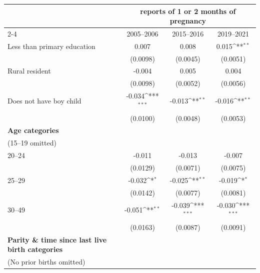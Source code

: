 {
\def\sym#1{\ifmmode^{#1}\else\(^{#1}\)\fi}
\begin{tabular}{l*{3}{c}}
\toprule
                    &\multicolumn{3}{c}{reports of 1 or 2 months of pregnancy}        \\\cmidrule(lr){2-4}
                    &\multicolumn{1}{c}{2005--2006}&\multicolumn{1}{c}{2015--2016}&\multicolumn{1}{c}{2019--2021}\\
\midrule
\hspace*{1em}Less than primary education&       0.007         &       0.008         &       0.015\sym{**} \\
                    &    (0.0098)         &    (0.0045)         &    (0.0051)         \\
\addlinespace
\hspace*{1em}Rural resident&      -0.004         &       0.005         &       0.004         \\
                    &    (0.0098)         &    (0.0052)         &    (0.0056)         \\
\addlinespace
\hspace*{1em}Does not have boy child&      -0.034\sym{***}&      -0.013\sym{**} &      -0.016\sym{**} \\
                    &    (0.0100)         &    (0.0048)         &    (0.0053)         \\
\addlinespace
\textbf{Age categories} \\ (15--19 omitted)&                     &                     &                     \\
\addlinespace
\hspace*{1em}20--24 &      -0.011         &      -0.013         &      -0.007         \\
                    &    (0.0129)         &    (0.0071)         &    (0.0075)         \\
\addlinespace
\hspace*{1em}25--29 &      -0.032\sym{*}  &      -0.025\sym{**} &      -0.019\sym{*}  \\
                    &    (0.0142)         &    (0.0077)         &    (0.0081)         \\
\addlinespace
\hspace*{1em}30--49 &      -0.051\sym{**} &      -0.039\sym{***}&      -0.030\sym{***}\\
                    &    (0.0163)         &    (0.0087)         &    (0.0091)         \\
\addlinespace
\textbf{Parity \& time since last live birth categories} \\ (No prior births omitted)&                     &                     &                     \\

\end{tabular}}
